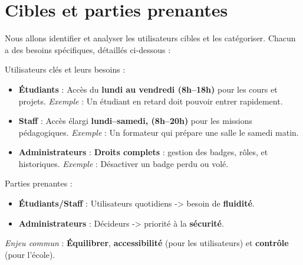 \newpage
\section{Cibles et parties prenantes}

Nous allons identifier et analyser les utilisateurs cibles et les catégoriser.
Chacun a des besoins spécifiques, détaillés ci-dessous :
\newline

\begin{for_you}{Utilisateurs clés et leurs besoins :}
    \begin{itemize}
        \item \textbf{Étudiants} :
              Accès du \textbf{lundi au vendredi (8h–18h)} pour les cours et projets.
              \newline
              \textit{Exemple} : Un étudiant en retard doit pouvoir entrer rapidement.

        \item \textbf{Staff} :
              Accès élargi \textbf{lundi–samedi, (8h–20h)} pour les missions pédagogiques.
              \newline
              \textit{Exemple} : Un formateur qui prépare une salle le samedi matin.

        \item \textbf{Administrateurs} :
              \textbf{Droits complets} : gestion des badges, rôles, et historiques.
              \newline
              \textit{Exemple} : Désactiver un badge perdu ou volé.
    \end{itemize}
\end{for_you}

\textit{\newline}

\begin{for_you}{Parties prenantes :}
    \begin{itemize}
        \item \textbf{Étudiants/Staff} : Utilisateurs quotidiens -> besoin de \textbf{fluidité}.
        \item \textbf{Administrateurs} : Décideurs -> priorité à la \textbf{sécurité}.
    \end{itemize}

    \textit{Enjeu commun} :
    \textbf{Équilibrer}, \textbf{accessibilité} (pour les utilisateurs) et \textbf{contrôle} (pour l’école).
\end{for_you}

